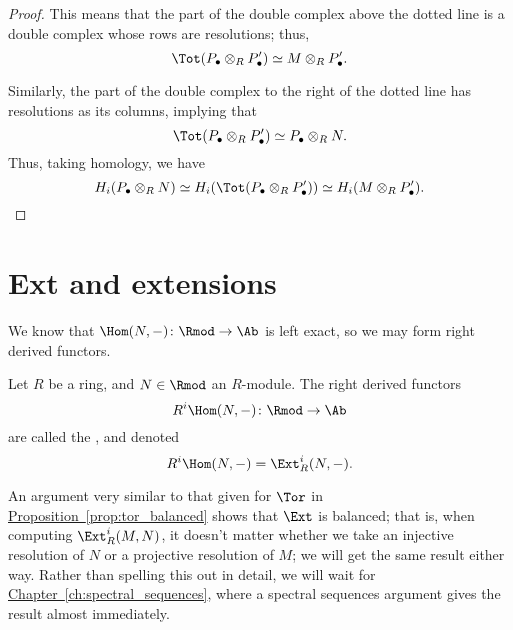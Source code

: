 \documentclass[main.tex]{subfiles}
\begin{document}
\begin{proof}
  This means that the part of the double complex above the dotted line is a double complex whose rows are resolutions; thus,
  \begin{equation*}
    \Tot(P_{\bullet} \otimes_{R} P'_{\bullet}) \simeq M \otimes_{R} P'_{\bullet}.
  \end{equation*}

  Similarly, the part of the double complex to the right of the dotted line has resolutions as its columns, implying that
  \begin{equation*}
    \Tot(P_{\bullet} \otimes_{R} P'_{\bullet}) \simeq P_{\bullet} \otimes_{R} N.
  \end{equation*}
  Thus, taking homology, we have
  \begin{equation*}
    H_{i}(P_{\bullet} \otimes_{R} N) \simeq H_{i}(\Tot(P_{\bullet} \otimes_{R} P'_{\bullet})) \simeq H_{i} (M \otimes_{R} P'_{\bullet}).
  \end{equation*}
\end{proof}


\section{Ext and extensions}
\label{sec:ext_and_extensions}

We know that $\Hom(N, -)\colon \Rmod \to \Ab$ is left exact, so we may form right derived functors.

\begin{definition}
  \label{def:ext_functor}
  Let $R$ be a ring, and $N \in \Rmod$ an $R$-module. The right derived functors
  \begin{equation*}
    R^{i}\Hom(N, -)\colon \Rmod \to \Ab
  \end{equation*}
  are called the , and denoted
  \begin{equation*}
    R^{i} \Hom(N, -) = \Ext_{R}^{i}(N, -).
  \end{equation*}
\end{definition}

An argument very similar to that given for $\Tor$ in \hyperref[prop:tor_balanced]{Proposition~\ref*{prop:tor_balanced}} shows that $\Ext$ is balanced; that is, when computing $\Ext^{i}_{R}(M, N)$,
it doesn't matter whether we take an injective resolution of $N$ or a projective resolution of $M$; we will get the same result either way. Rather than spelling this out in detail, we will wait for \hyperref[ch:spectral_sequences]{Chapter~\ref*{ch:spectral_sequences}}, where a spectral sequences argument gives the result almost immediately.
\end{document}
